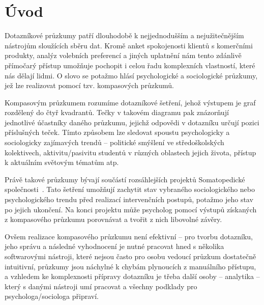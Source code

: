 \chapter*{Úvod}
\setcounter{page}{1}

Dotazníkové průzkumy patří dlouhodobě k nejjednodušším a nejužitečnějším nástrojům sloužících sběru dat. Kromě anket spokojenosti klientů s komerčními produkty, 
analýz volebních preferencí a jiných uplatnění nám tento zdánlivě přímočarý přístup umožňuje pochopit i celou řadu komplexních vlastností, které nás dělají lidmi. 
O slovo se potažmo hlásí psychologické a sociologické průzkumy, jež lze realizovat pomocí tzv. kompasových průzkumů.

Kompasovým průzkumem rozumíme dotazníkové šetření, jehož výstupem je graf rozdělený do čtyř kvadrantů. Tečky v takovém diagramu pak znázorňují jednotlivé účastníky 
daného průzkumu, jejichž odpovědi v dotazníku určují pozici příslušných teček. Tímto způsobem lze sledovat spoustu psychologicky a sociologicky 
zajímavých trendů – politické smýšlení ve středoškolských kolektivech, aktivitu/pasivitu studentů v různých oblastech jejich života, 
přístup k aktuálním světovým tématům atp.

Právě takové průzkumy bývají součástí rozsáhlejších projektů Somatopedické společnosti~\cite{Somspol2017}. Tato šetření umožňují zachytit stav vybraného 
sociologického nebo psychologického trendu před realizací intervenčních postupů, potažmo jeho stav po jejich ukončení. Na konci projektu může psycholog pomocí výstupů 
získaných z kompasového průzkumu porovnávat a tvořit z nich libovolné závěry.

Ovšem realizace kompasového průzkumu není efektivní – pro tvorbu dotazníku, jeho správu a následné vyhodnocení je nutné pracovat hned s několika softwarovými 
nástroji, které nejsou často pro osobu vedoucí průzkum dostatečně intuitivní, průzkumy jsou náchylné k chybám plynoucích z manuálního přístupu, a vzhledem ke 
komplexnosti přípravy dotazníku je třeba další osoby – analytika – který s danými nástroji umí pracovat a všechny podklady pro psychologa/sociologa připraví.

